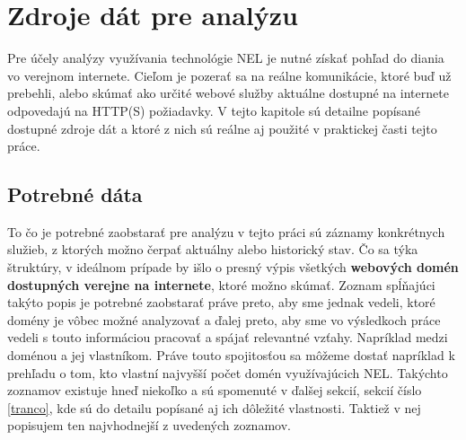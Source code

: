 \chapter{Zdroje dát pre analýzu}
\label{data-sources-available-for-research}

Pre účely analýzy využívania technológie NEL je nutné získať pohľad do diania vo verejnom internete.
Cieľom je pozerať sa na reálne komunikácie, ktoré buď už prebehli, alebo skúmať ako určité webové služby aktuálne dostupné na internete
odpovedajú na HTTP(S) požiadavky. V tejto kapitole sú detailne popísané dostupné zdroje dát 
a ktoré z nich sú reálne aj použité v praktickej časti tejto práce. %

\section{Potrebné dáta}

To čo je potrebné zaobstarať pre analýzu v tejto práci sú záznamy konkrétnych služieb, z ktorých možno čerpať aktuálny alebo historický stav. Čo sa týka štruktúry, v ideálnom prípade by išlo o presný výpis všetkých \textbf{webových domén dostupných verejne na internete}, ktoré možno skúmať. 
Zoznam spĺňajúci takýto popis je potrebné zaobstarať práve preto, aby sme jednak vedeli, ktoré domény je vôbec možné analyzovať a ďalej preto, aby sme vo výsledkoch práce vedeli s touto informáciou pracovať a spájať relevantné vzťahy. Napríklad medzi doménou a jej vlastníkom. 
Práve touto spojitosťou sa môžeme dostať napríklad k prehľadu o tom, kto vlastní najvyšší počet domén využívajúcich NEL. 
Takýchto zoznamov existuje hneď niekoľko a sú spomenuté v ďalšej sekcií, sekcií číslo \ref{tranco}, kde sú do detailu popísané aj ich dôležité vlastnosti. Taktiež v nej popisujem ten najvhodnejší z uvedených zoznamov.

